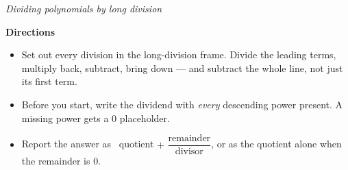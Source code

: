 \documentclass[12pt]{article}
\begin{document}

\begin{center}
{\small\textit{Dividing polynomials by long division}}
\end{center}

\vspace{0.15cm}
\noindent\textbf{Directions}
\begin{itemize}[leftmargin=0.7cm, itemsep=1pt, topsep=3pt]
  \item Set out every division in the long-division frame. Divide the leading
    terms, multiply back, subtract, bring down --- and subtract the whole line,
    not just its first term.
  \item Before you start, write the dividend with \emph{every} descending power
    present. A missing power gets a $0$ placeholder.
  \item Report the answer as \ quotient $+$ $\dfrac{\text{remainder}}{\text{divisor}}$,
    or as the quotient alone when the remainder is $0$.
\end{itemize}

\vspace{0.2cm}







\end{document}
